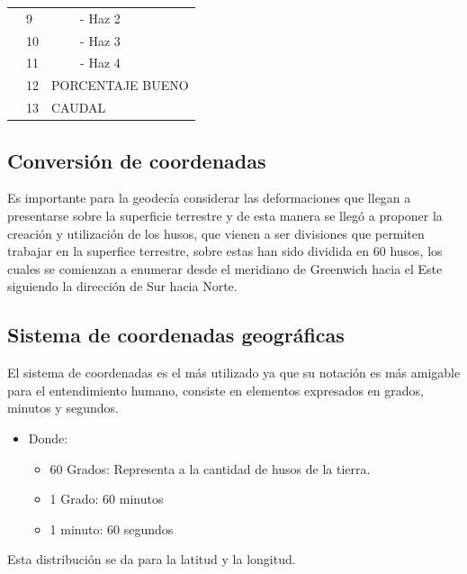 \documentclass[12pt,a4paper]{report}
\begin{document}
\begin{table}[h]
\begin{tabular}{|l|l|l|l|}
                                                                              & 9     &                                                   & - Haz 2                    \\ \cline{2-2} \cline{4-4} 
                                                                              & 10    &                                                   & - Haz 3                    \\ \cline{2-2} \cline{4-4} 
                                                                              & 11    &                                                   & - Haz 4                    \\ \cline{2-4} 
                                                                              & 12    & \multicolumn{2}{l|}{PORCENTAJE BUENO}                                          \\ \cline{2-4} 
                                                                              & 13    & \multicolumn{2}{l|}{CAUDAL}                                                    \\ \hline
\end{tabular}
\end{table} 



\subsection{Conversión de coordenadas}
Es importante para la geodecía considerar las deformaciones que llegan a presentarse sobre la superficie terrestre y de esta manera se llegó a proponer la creación y utilización de los husos, que vienen a ser divisiones que permiten trabajar en la superfice terrestre, sobre estas han sido dividida en 60 husos, los cuales se comienzan a enumerar desde el meridiano de Greenwich hacia el Este siguiendo la dirección de Sur hacia Norte.

\subsection{Sistema de coordenadas geográficas}
El sistema de coordenadas es el más utilizado ya que su notación es más amigable para el entendimiento humano, consiste en elementos expresados en grados, minutos y segundos.
\begin{itemize}
\item Donde:
	\begin{itemize}
	\item 60 Grados: Representa a la cantidad de husos de la tierra.
	\item 1 Grado: 60 minutos
	\item 1 minuto: 60 segundos
	\end{itemize}
\end{itemize}
Esta distribución se da para la latitud y la longitud.
\end{document}
